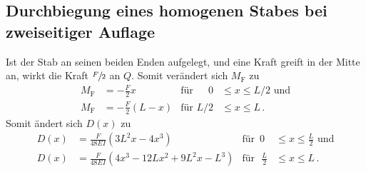 \subsection{Durchbiegung eines homogenen Stabes bei zweiseitiger Auflage}
Ist der Stab an seinen beiden Enden aufgelegt, und eine Kraft greift in der Mitte an, wirkt die Kraft
$\sfrac{F}{2}$ an $Q$.
Somit verändert sich $M_\text{F}$ zu
\begin{align*}
    M_\text{F} & = - \frac{F}{2} x &\text{für} \, \,\phantom{L/}0 &\leq x \leq L/2 \text{ und}\\
    M_\text{F} & = - \frac{F}{2} (L -x) &\text{für} \, \,L/2 &\leq x \leq L \, .
\end{align*}
Somit ändert sich $D(x)$ zu
\begin{align}
    \label{eq:rechts}
    D(x) & = \frac{F}{48EI}(3L^2x-4x^3) & \text{für} \, \,\,0 &\leq x \leq \frac{L}{2} \text{ und}\\
    \label{eq:links}
    D(x) & = \frac{F}{48EI}(4x^3- 12Lx^2+9L^2x-L^3) & \text{für } \, \, \frac{L}{2} &\leq x \leq L \, .
\end{align}